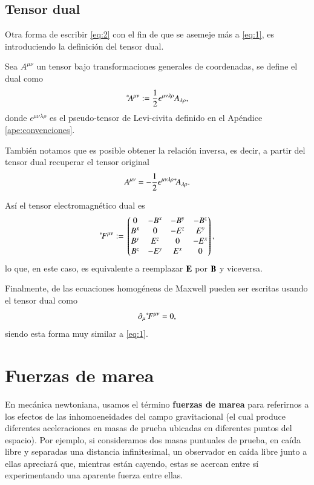 \subsection{Tensor dual}

Otra forma de escribir \eqref{eq:2} con el fin de que se asemeje más a \eqref{eq:1}, es introduciendo la definición del tensor dual. 

Sea $A^{\mu \nu}$ un tensor bajo transformaciones generales de coordenadas, se define el dual como
\begin{equation}
{}^*\! A^{\mu \nu} := \frac{1}{2} \epsilon^{\mu \nu \lambda \rho} A_{\lambda \rho},
\end{equation}
donde $\epsilon^{\mu \nu \lambda \rho}$ es el pseudo-tensor de Levi-civita definido en el Apéndice \ref{ape:convenciones}.

También notamos que es posible obtener la relación inversa, es decir, a partir del tensor dual recuperar el tensor original
\begin{equation}
A^{\mu \nu} = -\frac{1}{2} \epsilon^{\mu \nu \lambda \rho} {}^*\! A_{\lambda \rho}.
\end{equation}

Así el tensor electromagnético dual es
\begin{equation}
\label{eq:3}
\dual{F}^{\mu \nu} := \mqty*(
0 & -B^x & -B^y & -B^z \\
B^x & 0 & -E^z & E^y \\
B^y & E^z & 0 & -E^x \\
B^z & -E^y & E^x & 0 \\ 
),
\end{equation}
lo que, en este caso, es equivalente a reemplazar $\vb{E}$ por $\vb{B}$ y viceversa.

Finalmente, de las ecuaciones homogéneas de Maxwell pueden ser escritas usando el tensor dual como
\begin{equation}
\partial_{\mu} {}^*\! F^{\mu \nu} = 0,
\end{equation}
siendo esta forma muy similar a \eqref{eq:1}.

\section{Fuerzas de marea}
\label{sec:1}

En mecánica newtoniana, usamos el término \textbf{fuerzas de marea} para referirnos a los efectos de las inhomoeneidades del campo gravitacional (el cual produce diferentes aceleraciones en masas de prueba ubicadas en diferentes puntos del espacio). Por ejemplo, si consideramos dos masas puntuales de prueba, en caída libre y separadas una distancia infinitesimal, un observador en caída libre junto a ellas apreciará que, mientras están cayendo, estas se acercan entre sí experimentando una aparente fuerza entre ellas.

